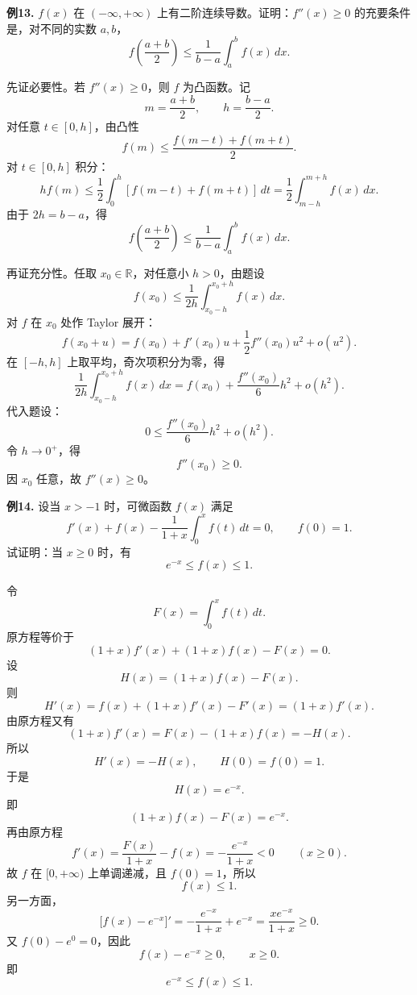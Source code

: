 \begin{problemblock}
\textbf{例13.} \(f(x)\) 在 \((-\infty,+\infty)\) 上有二阶连续导数。证明：\(f''(x)\ge0\) 的充要条件是，对不同的实数 \(a,b\)，
\[
f\left(\frac{a+b}{2}\right)
\le
\frac1{b-a}\int_a^b f(x)\,dx.
\]
\end{problemblock}
\begin{solutionblock}
先证必要性。若 \(f''(x)\ge0\)，则 \(f\) 为凸函数。记
\[
m=\frac{a+b}{2},\qquad h=\frac{b-a}{2}.
\]
对任意 \(t\in[0,h]\)，由凸性
\[
f(m)\le\frac{f(m-t)+f(m+t)}2.
\]
对 \(t\in[0,h]\) 积分：
\[
h f(m)\le\frac12\int_0^h[f(m-t)+f(m+t)]\,dt
=\frac12\int_{m-h}^{m+h}f(x)\,dx.
\]
由于 \(2h=b-a\)，得
\[
f\left(\frac{a+b}{2}\right)
\le
\frac1{b-a}\int_a^b f(x)\,dx.
\]

再证充分性。任取 \(x_0\in\mathbb{R}\)，对任意小 \(h>0\)，由题设
\[
f(x_0)\le \frac1{2h}\int_{x_0-h}^{x_0+h}f(x)\,dx.
\]
对 \(f\) 在 \(x_0\) 处作 Taylor 展开：
\[
f(x_0+u)=f(x_0)+f'(x_0)u+\frac12f''(x_0)u^2+o(u^2).
\]
在 \([-h,h]\) 上取平均，奇次项积分为零，得
\[
\frac1{2h}\int_{x_0-h}^{x_0+h}f(x)\,dx
=f(x_0)+\frac{f''(x_0)}6h^2+o(h^2).
\]
代入题设：
\[
0\le \frac{f''(x_0)}6h^2+o(h^2).
\]
令 \(h\to0^+\)，得
\[
f''(x_0)\ge0.
\]
因 \(x_0\) 任意，故 \(f''(x)\ge0\)。
\end{solutionblock}

\begin{problemblock}
\textbf{例14.} 设当 \(x>-1\) 时，可微函数 \(f(x)\) 满足
\[
f'(x)+f(x)-\frac1{1+x}\int_0^x f(t)\,dt=0,
\qquad f(0)=1.
\]
试证明：当 \(x\ge0\) 时，有
\[
e^{-x}\le f(x)\le1.
\]
\end{problemblock}
\begin{solutionblock}
令
\[
F(x)=\int_0^x f(t)\,dt.
\]
原方程等价于
\[
(1+x)f'(x)+(1+x)f(x)-F(x)=0.
\]
设
\[
H(x)=(1+x)f(x)-F(x).
\]
则
\[
H'(x)=f(x)+(1+x)f'(x)-F'(x)=(1+x)f'(x).
\]
由原方程又有
\[
(1+x)f'(x)=F(x)-(1+x)f(x)=-H(x).
\]
所以
\[
H'(x)=-H(x),\qquad H(0)=f(0)=1.
\]
于是
\[
H(x)=e^{-x}.
\]
即
\[
(1+x)f(x)-F(x)=e^{-x}.
\]
再由原方程
\[
f'(x)=\frac{F(x)}{1+x}-f(x)
=-\frac{e^{-x}}{1+x}<0\qquad(x\ge0).
\]
故 \(f\) 在 \([0,+\infty)\) 上单调递减，且 \(f(0)=1\)，所以
\[
f(x)\le1.
\]
另一方面，
\[
\bigl[f(x)-e^{-x}\bigr]'
=-\frac{e^{-x}}{1+x}+e^{-x}
=\frac{x e^{-x}}{1+x}\ge0.
\]
又 \(f(0)-e^0=0\)，因此
\[
f(x)-e^{-x}\ge0,\qquad x\ge0.
\]
即
\[
e^{-x}\le f(x)\le1.
\]
\end{solutionblock}

